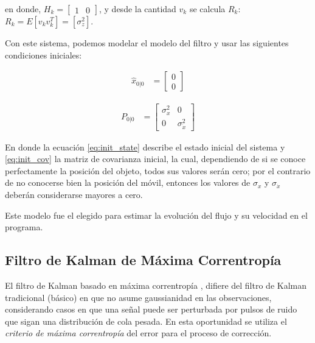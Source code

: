 en donde, $H_k = \begin{bmatrix}
1 & 0
\end{bmatrix}$, y desde la cantidad $v_k$ se calcula $R_k$: $R_k = E[v_kv_k^T]=[\sigma_{z}^2]$.

Con este sistema, podemos modelar el modelo del filtro y usar las siguientes condiciones iniciales:

\begin{align}
\hat{x}_{0|0} &= \begin{bmatrix}
0\\
0
\end{bmatrix}
\label{eq:init_state} 
\end{align} 

\begin{align}
P_{0|0} &= \begin{bmatrix}
\sigma_{x}^2 & 0\\
0 & \sigma_{\dot{x}}^2
\end{bmatrix}
\label{eq:init_cov} 
\end{align} 

En donde la ecuaci\'on \ref{eq:init_state} describe el estado inicial del sistema y \ref{eq:init_cov} la matriz de covarianza inicial, la cual, dependiendo de si se conoce perfectamente la posici\'on del objeto, todos sus valores ser\'an cero; por el contrario de no conocerse bien la posici\'on del m\'ovil, entonces los valores de $\sigma_{x}$ y $\sigma_{\dot{x}}$ deber\'an considerarse mayores a cero.
\bigskip

Este modelo fue el elegido para estimar la evoluci\'on del flujo y su velocidad en el programa.



\subsection{Filtro de Kalman de M\'axima Correntrop\'ia}

El filtro de Kalman basado en m\'axima correntrop\'ia \cite{badong}, difiere del filtro de Kalman tradicional (b\'asico) en que no asume gaussianidad en las observaciones, considerando casos en que una se\~nal puede ser perturbada por pulsos de ruido que sigan una distribuci\'on de cola pesada. En esta oportunidad se utiliza el \textit{criterio de m\'axima correntrop\'ia} del error para el proceso de correcci\'on. 
\bigskip

